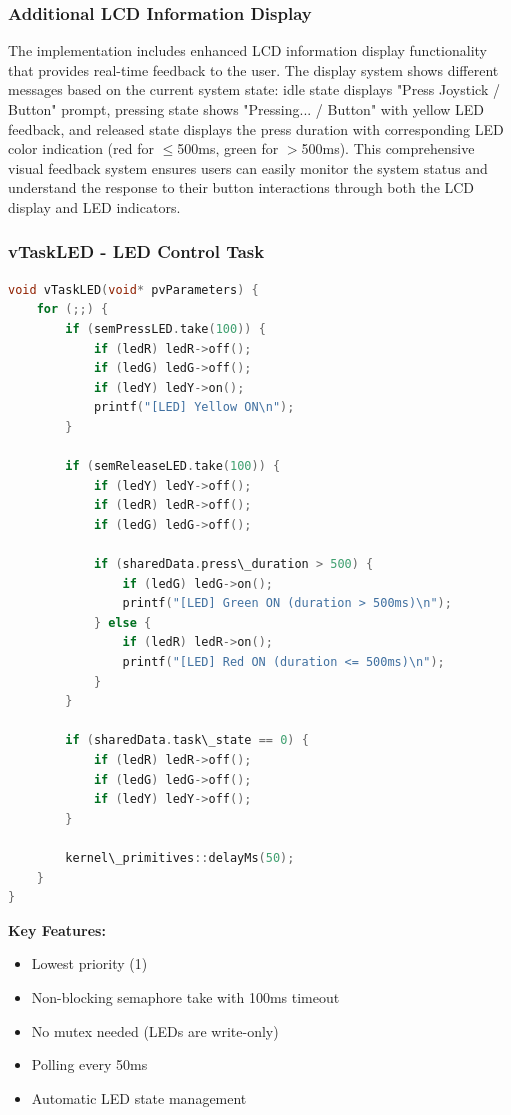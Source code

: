 \documentclass[12pt]{article}
\begin{document}
\subsubsection*{Additional LCD Information Display}

The implementation includes enhanced LCD information display functionality that provides real-time feedback to the user. The display system shows different messages based on the current system state: idle state displays "Press Joystick / Button" prompt, pressing state shows "Pressing... / Button" with yellow LED feedback, and released state displays the press duration with corresponding LED color indication (red for $\leq$500ms, green for $>$500ms). This comprehensive visual feedback system ensures users can easily monitor the system status and understand the response to their button interactions through both the LCD display and LED indicators.

\subsubsection*{vTaskLED - LED Control Task}

\begin{lstlisting}[language=C++, caption=LED Control Task (tasks.cpp)]
void vTaskLED(void* pvParameters) {
    for (;;) {
        if (semPressLED.take(100)) {
            if (ledR) ledR->off();
            if (ledG) ledG->off();
            if (ledY) ledY->on();
            printf("[LED] Yellow ON\n");
        }
        
        if (semReleaseLED.take(100)) {
            if (ledY) ledY->off();
            if (ledR) ledR->off();
            if (ledG) ledG->off();
            
            if (sharedData.press\_duration > 500) {
                if (ledG) ledG->on();
                printf("[LED] Green ON (duration > 500ms)\n");
            } else {
                if (ledR) ledR->on();
                printf("[LED] Red ON (duration <= 500ms)\n");
            }
        }
        
        if (sharedData.task\_state == 0) {
            if (ledR) ledR->off();
            if (ledG) ledG->off();
            if (ledY) ledY->off();
        }
        
        kernel\_primitives::delayMs(50);
    }
}
\end{lstlisting}

\textbf{Key Features:}
\begin{itemize}
    \item Lowest priority (1)
    \item Non-blocking semaphore take with 100ms timeout
    \item No mutex needed (LEDs are write-only)
    \item Polling every 50ms
    \item Automatic LED state management
\end{itemize}
\end{document}
